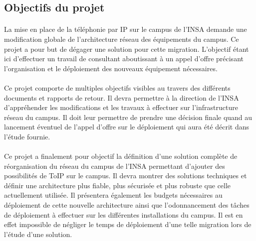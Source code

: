 \subsection{Objectifs du projet}
\paragraph{} La mise en place de la téléphonie par IP sur le campus de l'INSA demande une modification globale de l'architecture réseau des équipements du campus. Ce projet a pour but de dégager une solution pour cette migration. L'objectif étant ici d'effectuer un travail de consultant aboutissant à un appel d'offre précisant l'organisation et le déploiement des nouveaux équipement nécessaires.

\paragraph{} Ce projet comporte de multiples objectifs visibles au travers des différents documents et rapports de retour. Il devra permettre à la direction de l'INSA d'appréhender les modifications et les travaux à effectuer sur l'infrastructure réseau du campus. Il doit leur permettre de prendre une décision finale quand au lancement éventuel de l'appel d'offre sur le déploiement qui aura été décrit dans l'étude fournie.

\paragraph{} Ce projet a finalement pour objectif la définition d'une solution complète de réorganisation du réseau du campus de l'INSA permettant d'ajouter des possibilités de ToIP sur le campus. Il devra montrer des solutions techniques et définir une architecture plus fiable, plus sécurisée et plus robuste que celle actuellement utilisée. Il présentera également les budgets nécessaires au déploiement de cette nouvelle architecture ainsi que l'odonnancement des tâches de déploiement à effectuer sur les différentes installations du campus. Il est en effet impossible de négliger le temps de déploiement d'une telle migration lors de l'étude d'une solution.

